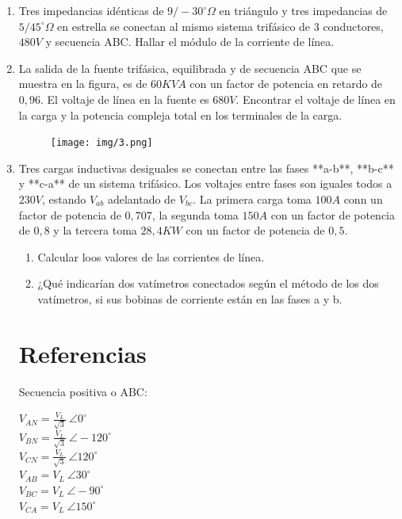 \documentclass[10pt,a4paper]{article}
\begin{document}
\begin{enumerate}
\item Tres impedancias idénticas de $9/-30^{\circ}\Omega$ en triángulo y tres impedancias de $5/45^{\circ}\Omega$ en estrella se conectan al mismo sistema trifásico de $3$ conductores, $480V$ y secuencia ABC. Hallar el módulo de la corriente de línea.

\item La salida de la fuente trifásica, equilibrada y de secuencia ABC que se muestra en la figura, es de $60KVA$ con un factor de potencia en retardo de $0,96$. El voltaje de línea en la fuente es $680V$. Encontrar el voltaje de línea en la carga y la potencia compleja total en los terminales de la carga.

\begin{figure}[H]
	\centering
	\texttt{[image: img/3.png]}
	\label{e6}
\end{figure}
\item Tres cargas inductivas desiguales se conectan entre las fases **a-b**, **b-c** y **c-a** de un sistema trifásico. Los voltajes entre fases son iguales todos a $230 V$, estando $V_{ab}$ adelantado de $V_{bc}$. La primera carga toma $100A$ conn un factor de potencia de $0,707$, la segunda toma $150A$ con un factor de potencia de $0,8$ y la tercera toma $28,4KW$ con un factor de potencia de $0,5$. 
\begin{enumerate}
	\item Calcular loos  valores de las corrientes de línea.
	\item ¿Qué indicarían dos vatímetros conectados según el método de los dos vatímetros, si sus bobinas de corriente están en las fases a y b.
\end{enumerate}

\section*{Referencias}
Secuencia positiva o ABC:

$V_{AN}= \frac{V_L}{\sqrt{3}}\ \angle0^{\circ}  $    \\
$V_{BN}= \frac{V_L}{\sqrt{3}}\ \angle-120^{\circ}  $    \\
$V_{CN}= \frac{V_L}{\sqrt{3}}\ \angle120^{\circ}  $    \\
$V_{AB} = V_L\ \angle 30^{\circ} $    \\
$V_{BC} = V_L\ \angle -90^{\circ}  $    \\
$V_{CA} = V_L\ \angle 150^{\circ} $    \\


\end{enumerate}
\end{document}
